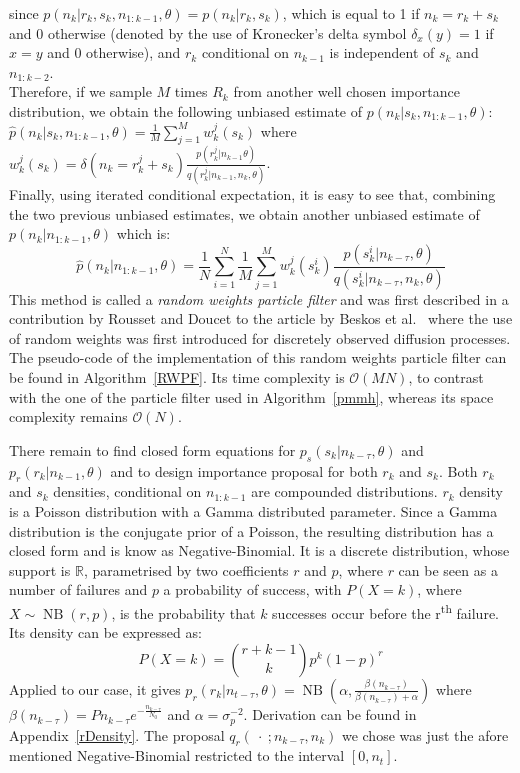 \documentclass[12pt]{article}
\begin{document}
	since $p(n_k| r_k, s_k, n_{1:k-1}, \theta)=p(n_k| r_k, s_k)$, which is equal to 1 if $n_k = r_k + s_k$ and 0 otherwise (denoted by the use of Kronecker's delta symbol $\delta_x(y) = 1$ if $x=y$ and 0 otherwise), and $r_k$ conditional on $n_{k-1}$ is independent of $s_k$ and $n_{1:k-2}$. \\
	Therefore, if we sample $M$ times $R_k$ from another well chosen importance distribution, we obtain the following unbiased estimate of $p(n_k |s_k, n_{1:k-1}, \theta)$: $\hat{p}(n_k |s_k, n_{1:k-1}, \theta)=\frac{1}{M}\sum_{j=1}^{M}w_k^j(s_k)$ where $w_k^j(s_k) =\delta(n_k = r_k^j + s_k)\frac{p(r_k^j|n_{k-1} \theta)}{q(r_k^j|n_{k-1}, n_k, \theta)}$. \\
	Finally, using iterated conditional expectation, it is easy to see that, combining the two previous unbiased estimates, we obtain another unbiased estimate of $p(n_k|n_{1:k-1},\theta)$ which is:
	\begin{equation}
	\hat{p}(n_k|n_{1:k-1},\theta) = \frac{1}{N}\sum_{i=1}^{N}\frac{1}{M}\sum_{j=1}^{M}w_k^j(s_k^i)\frac{p(s_k^i|n_{k-\tau}, \theta)}{q(s_k^i|n_{k-\tau}, n_k, \theta)}
	\end{equation}
	This method is called a \emph{random weights particle filter} and was first described in a contribution by Rousset and Doucet to the article by Beskos et al.~\cite{beskos2006exact} where the use of random weights was first introduced for discretely observed diffusion processes.\\
	The pseudo-code of the implementation of this random weights particle filter can be found in Algorithm~\ref{RWPF}. Its time complexity is $\mathcal{O}(MN)$, to contrast with the one of the particle filter used in Algorithm~\ref{pmmh}, whereas its space complexity remains $\mathcal{O}(N)$.
	
	There remain to find closed form equations for $p_s(s_k|n_{k-\tau}, \theta)$ and $p_r(r_k|n_{k-1}, \theta)$ and to design importance proposal for both $r_k$ and $s_k$. Both $r_k$ and $s_k$ densities, conditional on $n_{1:{k-1}}$ are compounded distributions. $r_k$ density is a Poisson distribution with a Gamma distributed parameter. Since a Gamma distribution is the conjugate prior of a Poisson, the resulting distribution has a closed form and is know as Negative-Binomial. It is a discrete distribution, whose support is $\mathbb{R}$, parametrised by two coefficients $r$ and $p$, where $r$ can be seen as a number of failures and $p$ a probability of success, with $P(X=k)$, where $X\sim \operatorname{NB}(r, p)$, is the probability that $k$ successes occur before the r\textsuperscript{th} failure. Its density can be expressed as: 
	\begin{equation*}
	P(X=k) = \binom{r+k-1}{k}p^k(1-p)^r
	\end{equation*}
	Applied to our case, it gives $p_r(r_k|n_{t-\tau}, \theta) = \operatorname{NB}(\alpha, \frac{\beta(n_{k-\tau})}{\beta(n_{k-\tau}) + \alpha})$ where  $\beta(n_{k-\tau}) = Pn_{k-\tau}e^{-\frac{n_{k-\tau}}{N_0}}$ and $\alpha = \sigma_p^{-2}$. Derivation can be found in Appendix~\ref{rDensity}.
	The proposal $q_r(\ \cdot \ ; n_{k-\tau}, n_k)$ we chose was just the afore mentioned Negative-Binomial restricted to the interval $[0, n_t]$.
	
\end{document}
